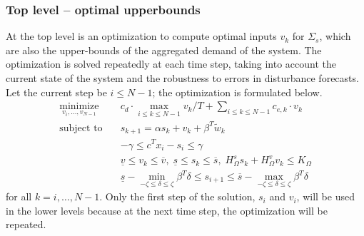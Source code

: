 \subsubsection*{Top level -- optimal upperbounds}

At the top level is an optimization to compute optimal inputs $v_{k}$ for $\Sigma_{s}$, which are also the upper-bounds of the aggregated demand of the system.
%
%
The %
optimization is solved repeatedly at each time step, taking into account the current state of the system and the robustness to errors in disturbance forecasts.
Let the current step be $i \leqslant N-1$; the optimization is formulated below.
\begin{align*}
  \operatorname*{minimize}_{v_{i}, \ldots, v_{N - 1}} \quad & c_d \cdot \max_{i
  \leqslant k \leqslant N - 1} v_k / T + \textstyle\sum_{i \leqslant k \leqslant N - 1}
  c_{e, k} \cdot v_k \\
  \text{subject to} \quad & s_{k+1} = \alpha s_{k} + v_{k} + \beta^{T} \tilde{w}_{k}  \nonumber\\
  & -\gamma \leqslant c^{T} x_{i} - s_{i} \leqslant \gamma \\
  & \underline{v} \leqslant v_{k} \leqslant \overbar{v}, \; \underline{s} \leqslant s_{k} \leqslant \overbar{s}, \; H_{\Omega}^{s} s_{k} + H_{\Omega}^{v} v_{k} \leqslant K_{\Omega} \\
  & \underline{s} - \min_{-\zeta \leqslant \delta \leqslant  \zeta} \beta^{T} \delta \leqslant s_{i+1} \leqslant \overbar{s} - \max_{-\zeta \leqslant \delta \leqslant \zeta} \beta^{T} \delta
\end{align*}
for all $k=i,\dots,N-1$.
Only the first step of the solution, \ie $s_{i}$ and $v_{i}$, will be used in the lower levels because at the next time step, the optimization will be repeated.

